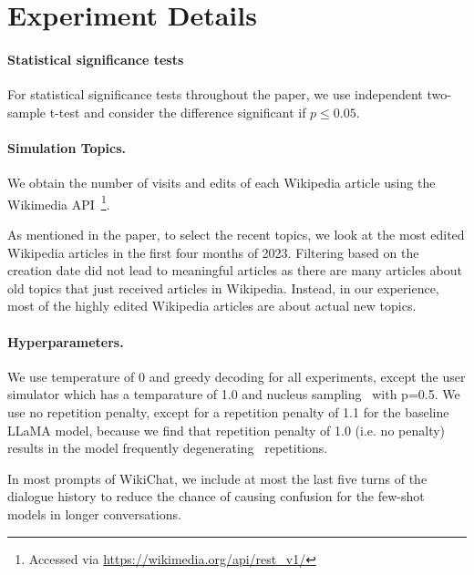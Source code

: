 \documentclass[11pt]{article}
\newcommand{\system}[0]{WikiChat\xspace}
\begin{document}
\section{Experiment Details}

\paragraph{Statistical significance tests}
For statistical significance tests throughout the paper, we use independent two-sample t-test and consider the difference significant if $p \leq 0.05$.

\paragraph{Simulation Topics.}
We obtain the number of visits and edits of each Wikipedia article using the Wikimedia API~\footnote{Accessed via \url{https://wikimedia.org/api/rest_v1/}}.

As mentioned in the paper, to select the recent topics, we look at the most edited Wikipedia
articles in the first four months of 2023.
Filtering based on the creation date did not lead to meaningful articles as there are many articles about old topics that just received articles in Wikipedia. Instead, in our experience, most of the highly edited Wikipedia articles are about actual new topics.

\paragraph{Hyperparameters.}
\label{appendix:hyperparameters}
We use temperature of 0 and greedy decoding for all experiments, except the user simulator which has a temparature of 1.0 and nucleus sampling~\cite{degeneration2019} with p=0.5.
We use no repetition penalty, except for a repetition penalty of 1.1 for the baseline LLaMA model, because we find that repetition penalty of 1.0 (i.e. no penalty) results in the model frequently degenerating~\cite{degeneration2019} repetitions.

In most prompts of \system, we include at most the last five turns of the dialogue history to reduce the chance of causing confusion for the few-shot models in longer conversations.
\end{document}
